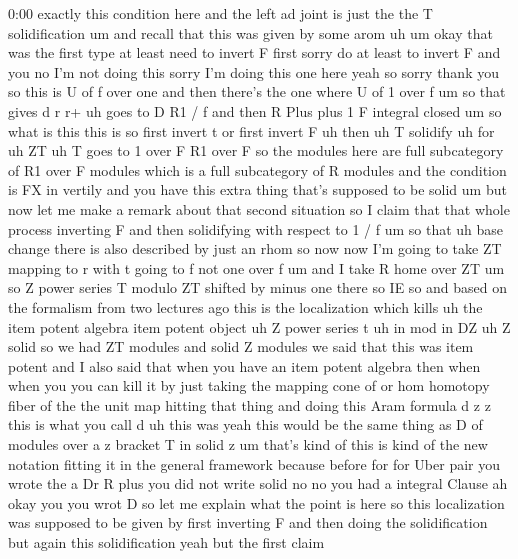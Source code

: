 \begin{unfinished}{0:00}
exactly  this  condition  here  and  the  left
ad  joint  is  just  the  the  T
solidification  um  and  recall  that  this
was  given  by  some
arom
uh
um  okay  that  was  the  first  type  at  least
need  to  invert  F  first  sorry  do  at  least
to  invert  F  and  you  no  I'm  not  doing
this  sorry  I'm  doing  this  one  here  yeah
so  sorry  thank  you  so  this  is  U  of  f
over  one  and  then  there's  the  one  where
U  of  1  over
f  um  so  that  gives  d  r  r+  uh  goes  to  D
R1  /  f  and  then  R  Plus  plus  1  F  integral
closed  um  so  what  is  this  this
is  so  first  invert  t  or  first  invert
F  uh  then  uh  T
solidify  uh  for  uh
ZT  uh  T  goes  to  1  over  F  R1  over
F
so
the  modules  here  are  full  subcategory  of
R1  over  F  modules  which  is  a  full
subcategory  of  R  modules  and  the
condition  is  FX  in  vertily  and  you  have
this  extra  thing  that's  supposed  to  be
solid  um  but  now  let  me  make  a  remark
about  that  second
situation  so  I  claim  that  that  whole
process  inverting  F  and  then  solidifying
with  respect  to  1  /  f  um  so  that  uh  base
change
there
is  also  described  by  just  an
rhom  so  now  now  I'm  going  to  take
ZT  mapping  to  r  with  t  going  to  f  not
one  over  f  um  and  I  take  R  home  over
ZT  um  so  Z  power  series  T  modulo
ZT  shifted  by  minus  one
there
so  IE  so  and  based  on  the  formalism  from
two  lectures  ago  this  is  the
localization  which
kills  uh  the  item  potent  algebra  item
potent
object  uh  Z  power  series  t  uh  in
mod  in
DZ  uh  Z
solid  so  we  had  ZT  modules  and  solid  Z
modules  we  said  that  this  was  item
potent  and  I  also  said  that  when  you
have  an  item  potent  algebra  then  when
when  you  you  can  kill  it  by  just  taking
the  mapping  cone  of  or  hom  homotopy
fiber  of  the  the  unit  map  hitting  that
thing  and  doing  this  Aram
formula  d  z
z  this  is  what  you  call  d  uh  this  was
yeah  this  would  be  the  same  thing  as  D
of  modules  over  a  z  bracket  T  in  solid
z  um  that's  kind  of  this  is  kind  of  the
new  notation  fitting  it  in  the  general
framework  because  before  for  for  Uber
pair  you  wrote  the
a  Dr  R  plus  you  did  not  write  solid  no
no  you  had  a  integral  Clause  ah  okay  you
you
wrot  D  so  let  me  explain  what  the  point
is  here  so  this  localization  was
supposed  to  be  given  by  first  inverting
F  and  then  doing  the
solidification  but  again  this
solidification  yeah  but  the  first  claim

\end{unfinished}
